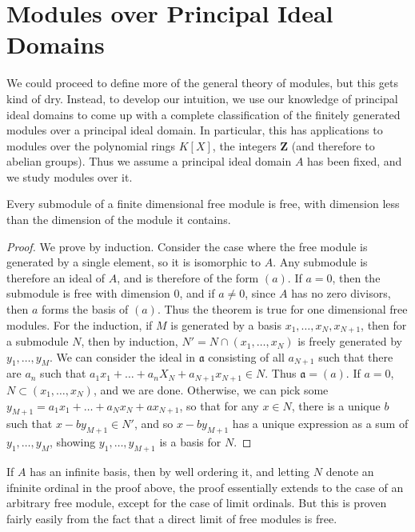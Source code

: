 \section{Modules over Principal Ideal Domains}

We could proceed to define more of the general theory of modules, but this gets kind of dry. Instead, to develop our intuition, we use our knowledge of principal ideal domains to come up with a complete classification of the finitely generated modules over a principal ideal domain. In particular, this has applications to modules over the polynomial rings $K[X]$, the integers $\mathbf{Z}$ (and therefore to abelian groups). Thus we assume a principal ideal domain $A$ has been fixed, and we study modules over it.

\begin{theorem}
    Every submodule of a finite dimensional free module is free, with dimension less than the dimension of the module it contains.
\end{theorem}
\begin{proof}
    We prove by induction. Consider the case where the free module is generated by a single element, so it is isomorphic to $A$. Any submodule is therefore an ideal of $A$, and is therefore of the form $(a)$. If $a = 0$, then the submodule is free with dimension $0$, and if $a \neq 0$, since $A$ has no zero divisors, then $a$ forms the basis of $(a)$. Thus the theorem is true for one dimensional free modules. For the induction, if $M$ is generated by a basis $x_1, \dots, x_N, x_{N+1}$, then for a submodule $N$, then by induction, $N' = N \cap (x_1, \dots, x_N)$ is freely generated by $y_1, \dots, y_M$. We can consider the ideal in $\mathfrak{a}$ consisting of all $a_{N+1}$ such that there are $a_n$ such that $a_1x_1 + \dots + a_nX_N + a_{N+1} x_{N+1} \in N$. Thus $\mathfrak{a} = (a)$. If $a = 0$, $N \subset (x_1, \dots, x_N)$, and we are done. Otherwise, we can pick some $y_{M+1} = a_1x_1 + \dots + a_Nx_N + a x_{N+1}$, so that for any $x \in N$, there is a unique $b$ such that $x - by_{M+1} \in N'$, and so $x - by_{M+1}$ has a unique expression as a sum of $y_1, \dots, y_M$, showing $y_1, \dots, y_{M+1}$ is a basis for $N$.
\end{proof}

\begin{remark}
    If $A$ has an infinite basis, then by well ordering it, and letting $N$ denote an ifninite ordinal in the proof above, the proof essentially extends to the case of an arbitrary free module, except for the case of limit ordinals. But this is proven fairly easily from the fact that a direct limit of free modules is free.
\end{remark}

